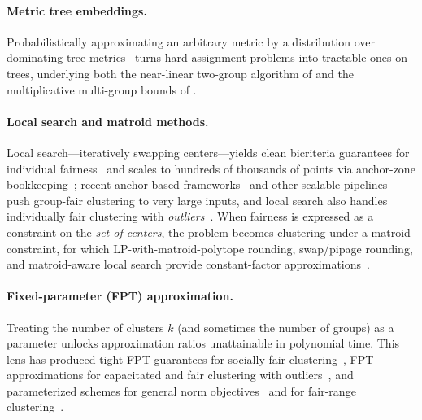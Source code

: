 \paragraph{Metric tree embeddings.} Probabilistically approximating an arbitrary metric by a distribution over dominating tree metrics~\citep{bartal1998approximating,fakcharoenphol2003tight} turns hard assignment problems into tractable ones on trees, underlying both the near-linear two-group algorithm of \citet{backurs2019scalable} and the multiplicative multi-group bounds of \citet{DBLP:conf/fat/DaiMV22}.

\paragraph{Local search and matroid methods.} Local search---iteratively swapping centers---yields clean bicriteria guarantees for individual fairness~\citep{MahabadiV20} and scales to hundreds of thousands of points via anchor-zone bookkeeping~\citep{bateni2024scalable}; recent anchor-based frameworks~\citep{anchorfair2025} and other scalable pipelines~\citep{fastfairscale2026} push group-fair clustering to very large inputs, and local search also handles individually fair clustering with \emph{outliers}~\citep{lsindivoutliers2025}. When fairness is expressed as a constraint on the \emph{set of centers}, the problem becomes clustering under a matroid constraint, for which LP-with-matroid-polytope rounding, swap/pipage rounding, and matroid-aware local search provide constant-factor approximations~\citep{krishnaswamy2011matroid,chen2016matroid,krishnaswamy2018constant}.

\paragraph{Fixed-parameter (FPT) approximation.} Treating the number of clusters $k$ (and sometimes the number of groups) as a parameter unlocks approximation ratios unattainable in polynomial time. This lens has produced tight FPT guarantees for socially fair clustering~\citep{fptsociallyfair2021,DBLP:journals/ipl/GoyalJ23}, FPT approximations for capacitated and fair clustering with outliers~\citep{fptcapfairoutliers2023}, and parameterized schemes for general norm objectives~\citep{genericnormfpt2023} and for fair-range clustering~\citep{fairrangefpt2026}.

